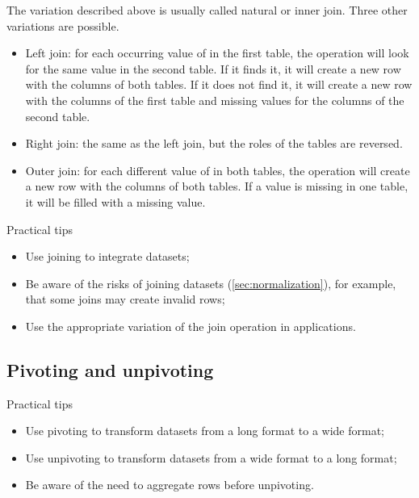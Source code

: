 The variation described above is usually called natural or inner join.  Three other
variations are possible.
\begin{itemize}
  \item Left join: for each occurring value of  in the first table, the operation
    will look for the same value in the second table.  If it finds it, it will create a new
    row with the columns of both tables.  If it does not find it, it will create a new row
    with the columns of the first table and missing values for the columns of the second
    table.
  \item Right join: the same as the left join, but the roles of the tables are reversed.
  \item Outer join: for each different value of  in both tables, the operation
    will create a new row with the columns of both tables.  If a value is missing in one
    table, it will be filled with a missing value.
\end{itemize}

\begin{hlbox}{Practical tips}
  \begin{itemize}
    \item Use joining to integrate datasets;
    \item Be aware of the risks of joining datasets (\cref{sec:normalization}), for
      example, that some joins may create invalid rows;
    \item Use the appropriate variation of the join operation in applications.
  \end{itemize}
\end{hlbox}

\subsection{Pivoting and unpivoting}


\begin{hlbox}{Practical tips}
  \begin{itemize}
    \item Use pivoting to transform datasets from a long format to a wide format;
    \item Use unpivoting to transform datasets from a wide format to a long format;
    \item Be aware of the need to aggregate rows before unpivoting.
  \end{itemize}
\end{hlbox}

